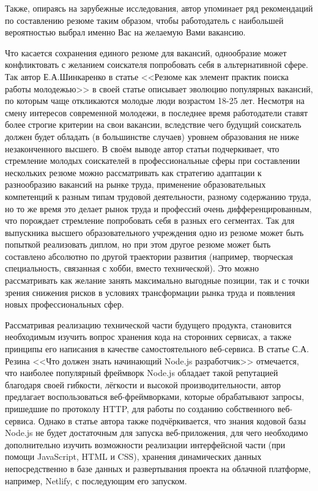 \documentclass[master, och, diploma]{SCWorks}
\begin{document}
Также, опираясь на зарубежные исследования, автор упоминает ряд рекомендаций по составлению резюме таким образом, чтобы работодатель с наибольшей вероятностью выбрал именно Вас на желаемую Вами вакансию\cite{Kosolapova_2020}.

Что касается сохранения единого резюме для вакансий, однообразие может конфликтовать с желанием соискателя попробовать себя в альтернативной сфере. Так автор Е.А.Шинкаренко в статье <<Резюме как элемент практик поиска работы молодежью>> в своей статье описывает эволюцию популярных вакансий, по которым чаще откликаются молодые люди возрастом 18-25 лет. Несмотря на смену интересов современной молодежи, в последнее время работодатели ставят более строгие критерии на свои вакансии, вследствие чего будущий соискатель должен будет обладать (в большинстве случаев) уровнем образования не ниже незаконченного высшего. В своём выводе автор статьи подчеркивает, что стремление молодых соискателей в профессиональные сферы при составлении нескольких резюме можно рассматривать как стратегию адаптации к разнообразию вакансий на рынке труда, применение образовательных компетенций к разным типам трудовой деятельности, разному содержанию труда, но то же время это делает рынок труда и профессий очень дифференцированным, что порождает стремление попробовать себя в разных его сегментах\cite{Shinkarenko_2022}. Так для выпускника высшего образовательного учреждения одно из резюме может быть попыткой реализовать диплом, но при этом другое резюме может быть составлено абсолютно по другой траектории развития (например, творческая специальность, связанная с хобби, вместо технической). Это можно рассматривать как желание занять максимально выгодные позиции, так и с точки зрения снижения рисков в условиях трансформации рынка труда и появления новых профессиональных сфер\cite{Shinkarenko_2021}.

Рассматривая реализацию технической части будущего продукта, становится необходимым изучить вопрос хранения кода на сторонних сервисах, а также принципы его написания в качестве самостоятельного веб-сервиса. В статье С.А. Резина <<Что должен знать начинающий Node.js разработчик>> отмечается, что наиболее популярный фреймворк Node.js обладает такой репутацией благодаря своей гибкости, лёгкости и высокой производительности, автор предлагает воспользоваться веб-фреймворками, которые обрабатывают запросы, пришедшие по протоколу HTTP, для работы по созданию собственного веб-сервиса\cite{Razin_2020}. Однако в статье автора также подчёркивается, что знания кодовой базы Node.js не будет достаточным для запуска веб-приложения, для чего необходимо дополнительно изучить возможности реализации интерфейсной части (при помощи JavaScript, HTML и CSS), хранения динамических данных непосредственно в базе данных и развертывания проекта на облачной платформе, например, Netlify, с последующим его запуском\cite{Holms_2023}.
\end{document}
